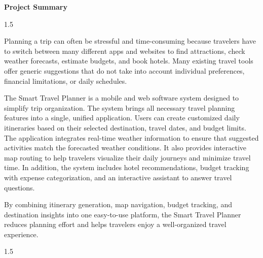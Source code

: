 \documentclass[A4paper,12pt]{report}
\theoremstyle{plain}
\theoremstyle{definition}
\renewcommand*\listfigurename{\par\hbox{LIST OF FIGURES \strut}\hrule height .05cm}
\renewcommand*\listtablename{\par\hbox{LIST OF TABLES \strut}\hrule height .05cm}
\theoremstyle{remark}
\numberwithin{equation}{section}
\begin{document}
\newpage
\begin{center}
\Large{\textbf{Project Summary}}\\
\end{center}
\setlength{\parindent}{0pt}
\begin{spacing}{1.5}
\normalsize{Planning a trip can often be stressful and time-consuming because travelers have to switch between many different apps and websites to find attractions, check weather forecasts, estimate budgets, and book hotels. Many existing travel tools offer generic suggestions that do not take into account individual preferences, financial limitations, or daily schedules. 

The Smart Travel Planner is a mobile and web software system designed to simplify trip organization. The system brings all necessary travel planning features into a single, unified application. Users can create customized daily itineraries based on their selected destination, travel dates, and budget limits. The application integrates real-time weather information to ensure that suggested activities match the forecasted weather conditions. It also provides interactive map routing to help travelers visualize their daily journeys and minimize travel time. In addition, the system includes hotel recommendations, budget tracking with expense categorization, and an interactive assistant to answer travel questions. 

By combining itinerary generation, map navigation, budget tracking, and destination insights into one easy-to-use platform, the Smart Travel Planner reduces planning effort and helps travelers enjoy a well-organized travel experience.}
\end{spacing}
\begin{spacing}{1.5}
\newpage
\renewcommand{\cftaftertoctitle}{\hfill}
\renewcommand*\cftaftertoctitle{{\strut \hfill}\hrule height .05cm}

\!
\tableofcontents
\!

\!
\centering \renewcommand*\listfigurename{LIST OF FIGURES}
\renewcommand{\cftafterloftitle}{\hfill}
\renewcommand*\cftafterloftitle{{\strut \hfill}\hrule height .05cm}
\newpage
\listoffigures
\!
\clearpage
{\let\oldnumberline\numberline%
\renewcommand{\numberline}{\tablename~\oldnumberline}%
\centering \renewcommand*\listtablename{LIST OF TABLES}
\renewcommand{\cftafterlottitle}{\hfill}
\renewcommand*\cftafterlottitle{{\strut \hfill}\hrule height .05cm}
\listoftables}
\clearpage
\end{spacing}
\end{document}
